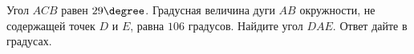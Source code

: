 \begin{ex}
	\begin{condition}
		Угол \( ACB \)  равен \( 29 \degree \). Градусная величина дуги \( AB \)  окружности, не содержащей точек \( D \)  и \( E \), равна \( 106 \) градусов. Найдите угол \( DAE \). Ответ дайте в градусах.
	\end{condition}
\end{ex}